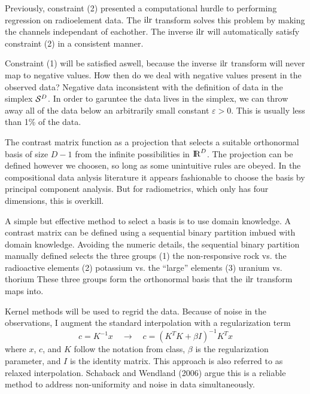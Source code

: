 \medskip
Previously, constraint (2) presented a computational hurdle to performing regression on radioelement data.
The $\rm ilr$ transform solves this problem by making the channels independant of eachother.
The inverse $\rm ilr$ will automatically satisfy constraint (2) in a consistent manner.

\medskip
Constraint (1) will be satisfied aswell, because the inverse $\rm ilr$ transform will never map to negative values.
How then do we deal with negative values present in the observed data?
Negative data inconsistent with the definition of data in the simplex ${\cal S}^D$.
In order to garuntee the data lives in the simplex, we can throw away all of the data below an arbitrarily small constant $\varepsilon > 0$. 
This is usually less than 1\% of the data.

\bigskip
{}
The contrast matrix function as a projection that selects a suitable orthonormal basis of size $D-1$ from the infinite possibilities in ${\rm I \kern -2pt R}^D$.
The projection can be defined however we choosen, so long as some unintuitive rules are obeyed.
In the compositional data anlysis literature it appears fashionable to choose the basis by principal component analysis.
But for radiometrics, which only has four dimensions, this is overkill.

\medskip
A simple but effective method to select a basis is to use domain knowledge.
A contrast matrix can be defined using a {\reportifont sequential binary partition\/} imbued with domain knowledge.
Avoiding the numeric details, the sequential binary partition manually defined selects the three groups
\medskip
\noindent \quad (1) \quad the non-responsive rock vs. the radioactive elements
\smallskip
\noindent \quad (2) \quad potassium vs. the ``large'' elements
\smallskip
\noindent \quad (3) \quad uranium vs. thorium
\medskip
\noindent These three groups form the orthonormal basis that the $\rm ilr$ transform maps into.

\bigskip
{}
Kernel methods will be used to regrid the data.
Because of noise in the observations, I augment the standard interpolation with a regularization term
$$c = K^{-1} x \quad \longrightarrow \quad c = (K^T \! K + \beta I )^{-1} K^T x$$
where $x$, $c$, and $K$ follow the notation from class, $\beta$ is the regularization parameter, and $I$ is the identity matrix.
This approach is also referred to as {\reportifont relaxed interpolation\/}.
Schaback and Wendland (2006) argue this is a reliable method to address non-uniformity and noise in data simultaneously.

